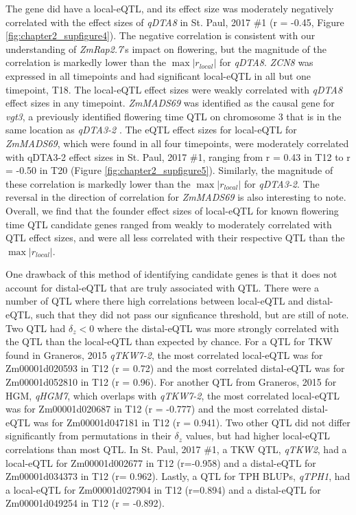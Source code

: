 \documentclass[article,9pt,twocolumn,twoside]{rilabRxiv}
\begin{document}
The gene did have a local-eQTL, and its effect size was moderately negatively correlated with the effect sizes of \textit{qDTA8} in St. Paul, 2017 \#1 (r = -0.45, Figure \ref{fig:chapter2_supfigure4}).
The negative correlation is consistent with our understanding of \textit{ZmRap2.7}'s impact on flowering, but the magnitude of the correlation is markedly lower than the $\max {|r_{local}|}$ for \textit{qDTA8}.
\textit{ZCN8} was expressed in all timepoints and had significant local-eQTL in all but one timepoint, T18.
The local-eQTL effect sizes were weakly correlated with \textit{qDTA8} effect sizes in any timepoint.
\textit{ZmMADS69} was identified as the causal gene for \textit{vgt3}, a previously identified flowering time QTL on chromosome 3 that is in the same location as \textit{qDTA3-2} \citep{Liang}.
The eQTL effect sizes for local-eQTL for \textit{ZmMADS69}, which were found in all four timepoints, were moderately correlated with qDTA3-2 effect sizes in St. Paul, 2017 \#1, ranging from r = 0.43 in T12 to r = -0.50 in T20 (Figure \ref{fig:chapter2_supfigure5}).
Similarly, the magnitude of these correlation is markedly lower than the $\max {|r_{local}|}$ for \textit{qDTA3-2}.
The reversal in the direction of correlation for \textit{ZmMADS69} is also interesting to note.
Overall, we find that the founder effect sizes of local-eQTL for known flowering time QTL candidate genes ranged from weakly to moderately correlated with QTL effect sizes, and were all less correlated with their respective QTL than the $\max {|r_{local}|}$.
\par
One drawback of this method of identifying candidate genes is that it does not account for distal-eQTL that are truly associated with QTL.
There were a number of QTL where there high correlations between local-eQTL and distal-eQTL, such that they did not pass our signficance threshold, but are still of note.
Two QTL had $\delta_z < 0$ where the distal-eQTL was more strongly correlated with the QTL than the local-eQTL than expected by chance. 
For a QTL for TKW found in Graneros, 2015 \textit{qTKW7-2}, the most correlated local-eQTL was for Zm00001d020593 in T12 (r = 0.72) and the most correlated distal-eQTL was for Zm00001d052810 in T12 (r = 0.96).
For another QTL from Graneros, 2015 for HGM, \textit{qHGM7}, which overlaps with \textit{qTKW7-2}, the most correlated local-eQTL was for  Zm00001d020687 in T12 (r = -0.777) and the most correlated distal-eQTL was for Zm00001d047181 in T12 (r = 0.941).
Two other QTL did not differ significantly from permutations in their $\delta_z$ values, but had higher local-eQTL correlations than most QTL.
In St. Paul, 2017 \#1, a TKW QTL, \textit{qTKW2}, had a local-eQTL for Zm00001d002677 in T12 (r=-0.958) and a distal-eQTL for Zm00001d034373 in T12 (r= 0.962).
Lastly, a QTL for TPH BLUPs, \textit{qTPH1}, had a local-eQTL for Zm00001d027904 in T12 (r=0.894) and a distal-eQTL for Zm00001d049254 in T12 (r = -0.892).
\end{document}
